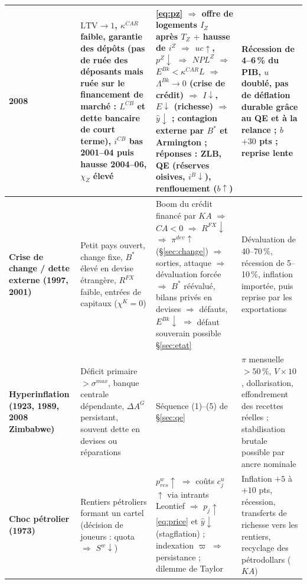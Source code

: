 \documentclass[11pt,a4paper]{article}
\begin{document}
\begin{center}
\begin{longtable}{p{2.2cm}p{4.0cm}p{5.7cm}p{3.0cm}}
\midrule
\textbf{2008} & $\mathrm{LTV} \to 1$, $\kappa^{CAR}$ faible, garantie des dépôts (pas de ruée des déposants mais ruée sur le financement de marché : $L^{CB}$ et dette bancaire de court terme), $i^{CB}$ bas 2001--04 puis hausse 2004--06, $\chi_Z$ élevé & \eqref{eq:pz} $\Rightarrow$ offre de logements $I_Z$ après $T_Z$ $+$ hausse de $i^Z$ $\Rightarrow$ $uc \uparrow$, $p^Z \downarrow$ $\Rightarrow$ $NPL^Z$ $\Rightarrow$ $E^{Bk} < \kappa^{CAR} L$ $\Rightarrow$ $\Lambda^{Bk} \to 0$ (crise de crédit) $\Rightarrow$ $I \downarrow$, $E \downarrow$ (richesse) $\Rightarrow$ $\hat y \downarrow$ ; contagion externe par $B^\ast$ et Armington ; réponses : ZLB, QE (réserves oisives, $i^B \downarrow$), renflouement ($b \uparrow$) & Récession de 4--6\,\% du PIB, $u$ doublé, pas de déflation durable grâce au QE et à la relance ; $b$ $+30$ pts ; reprise lente\\
\midrule
\textbf{Crise de change / dette externe (1997, 2001)} & Petit pays ouvert, change fixe, $B^\ast$ élevé en devise étrangère, $R^{FX}$ faible, entrées de capitaux ($\chi^K = 0$) & Boom du crédit financé par $KA$ $\Rightarrow$ $CA < 0$ $\Rightarrow$ $R^{FX} \downarrow$ $\Rightarrow$ $\pi^{dev} \uparrow$ (\S\ref{sec:change}) $\Rightarrow$ sorties, attaque $\Rightarrow$ dévaluation forcée $\Rightarrow$ $B^\ast$ réévalué, bilans privés en devises $\Rightarrow$ défauts, $E^{Bk} \downarrow$ $\Rightarrow$ défaut souverain possible \S\ref{sec:etat} & Dévaluation de 40--70\,\%, récession de 5--10\,\%, inflation importée, puis reprise par les exportations\\
\midrule
\textbf{Hyperinflation (1923, 1989, 2008 Zimbabwe)} & Déficit primaire $> \sigma^{max}$, banque centrale dépendante, $\Delta A^G$ persistant, souvent dette en devises ou réparations & Séquence (1)--(5) de \S\ref{sec:qe} & $\pi$ mensuelle $> 50\,\%$, $V \times 10$, dollarisation, effondrement des recettes réelles ; stabilisation brutale possible par ancre nominale\\
\midrule
\textbf{Choc pétrolier (1973)} & Rentiers pétroliers formant un cartel (décision de joueurs : quota $\Rightarrow$ $S^w \downarrow$) & $p^w_{res} \uparrow$ $\Rightarrow$ coûts $c^u_j$ $\uparrow$ via intrants Leontief $\Rightarrow$ $p_j \uparrow$ \eqref{eq:price} et $\hat y \downarrow$ (stagflation) ; indexation $\varpi$ $\Rightarrow$ persistance ; dilemme de Taylor & Inflation $+5$ à $+10$ pts, récession, transferts de richesse vers les rentiers, recyclage des pétrodollars ($KA$)\\
\bottomrule
\end{longtable}
\end{center}
\end{document}
